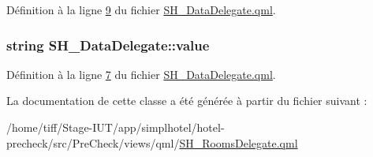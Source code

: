 Définition à la ligne \hyperlink{SH__DataDelegate_8qml_source_l00009}{9} du fichier \hyperlink{SH__DataDelegate_8qml_source}{S\-H\-\_\-\-Data\-Delegate.\-qml}.

\hypertarget{classSH__DataDelegate_acb9da3c73493c88865e08d9575f26482}{
\subsubsection[{value}]{\setlength{\rightskip}{0pt plus 5cm}string S\-H\-\_\-\-Data\-Delegate\-::value\hspace{0.3cm}{\ttfamily [inherited]}}}\label{classSH__DataDelegate_acb9da3c73493c88865e08d9575f26482}


Définition à la ligne \hyperlink{SH__DataDelegate_8qml_source_l00007}{7} du fichier \hyperlink{SH__DataDelegate_8qml_source}{S\-H\-\_\-\-Data\-Delegate.\-qml}.



La documentation de cette classe a été générée à partir du fichier suivant \-:\begin{DoxyCompactItemize}
\item 
/home/tiff/\-Stage-\/\-I\-U\-T/app/simplhotel/hotel-\/precheck/src/\-Pre\-Check/views/qml/\hyperlink{SH__RoomsDelegate_8qml}{S\-H\-\_\-\-Rooms\-Delegate.\-qml}\end{DoxyCompactItemize}
